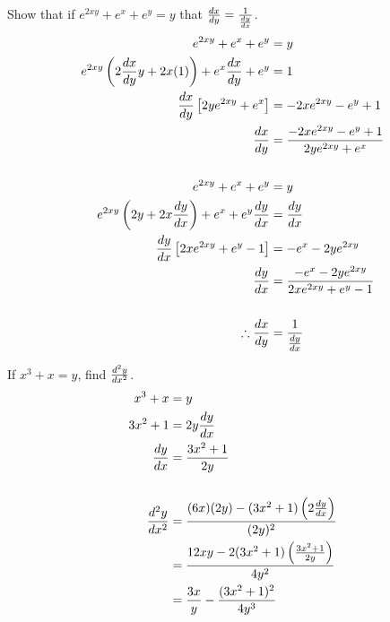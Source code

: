 \begin{exercise}\nonumber
    Show that if $ e^{2xy} +e^x + e^y = y $ that $ {dx \over dy} = {1 \over {dy \over dx}} $. \\

    \begin{align}
        e^{2xy} + e^x + e^y                                                  & = y                                            \\
        e^{2xy}\left(2{dx \over dy}y + 2x(1)\right) + e^x{dx \over dy} + e^y & = 1                                            \\
        {dx \over dy}\left[2ye^{2xy} + e^x\right]                            & = -2xe^{2xy} - e^y + 1                         \\
        {dx \over dy}                                                        & = {-2xe^{2xy} - e^y + 1 \over 2ye^{2xy} + e^x} \\
        \\
        e^{2xy} + e^x + e^y                                                  & = y                                            \\
        e^{2xy}\left(2y + 2x{dy \over dx}\right) + e^x + e^y{dy \over dx}    & = {dy \over dx}                                \\
        {dy \over dx}\left[2xe^{2xy} + e^y - 1\right]                        & = -e^x - 2ye^{2xy}                             \\
        {dy \over dx}                                                        & = {-e^x - 2ye^{2xy} \over 2xe^{2xy} + e^y -1}  \\
        \\
        \therefore {dx \over dy}                                             & = {1 \over {dy \over dx}}
    \end{align}
\end{exercise}

\begin{exercise}\nonumber
    If $ x^3 + x = y $, find $ d^2y \over dx^2 $. \\

    \begin{align}
        x^3 + x         & = y                                                             \\
        3x^2 + 1        & = 2y{dy \over dx}                                               \\
        {dy \over dx}   & = {3x^2 + 1 \over 2y}                                           \\
        \\
        d^2y \over dx^2 & = {(6x)(2y) - (3x^2+1)\left(2{dy \over dx}\right) \over (2y)^2} \\
                        & = {12xy - 2(3x^2+1)\left({3x^2+1 \over 2y}\right) \over 4y^2}   \\
                        & = {3x \over y} - {(3x^2+1)^2 \over 4y^3}
    \end{align}
\end{exercise}

